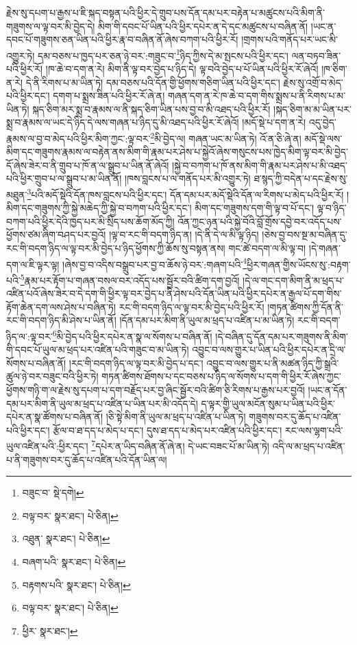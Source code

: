 རྗེས་སུ་དཔག་པ་རྒྱས་པ་ཇི་སྐད་བསྟན་པའི་ཕྱིར་དེ་གྲུབ་པས་དོན་དམ་པར་བརྟེན་པ་མཚུངས་པའི་མིག་ནི་གཟུགས་ལ་ལྟ་བར་མི་བྱེད་དེ། མིག་གི་དབང་པོ་ཡིན་པའི་ཕྱིར་དཔེར་ན་དེ་དང་མཚུངས་པ་བཞིན་ནོ། །ཡང་ན་དབང་པོ་གཟུགས་ཅན་ཡིན་པའི་ཕྱིར་རྣ་བ་བཞིན་ནོ་ཞེས་བཀག་པའི་ཕྱིར་རོ། །གྲགས་པའི་གནོད་པར་ཡང་མི་འགྱུར་ཏེ། དམ་བཅས་པ་ཁྱད་པར་ཅན་ཉེ་བར་:གཟུང་བ་\footnote{བཟུང་བ་  སྡེ་དགེ། }ཉིད་ཀྱིས་དེ་མ་སྤངས་པའི་ཕྱིར་དང་། ལན་བཏབ་ཟིན་པའི་ཕྱིར་རོ། །ཁ་ཆེ་བ་དག་ན་རེ། མིག་ནི་ལྟ་བར་བྱེད་པ་ཉིད་དེ། ལྟ་བའི་བྱེད་པ་པོ་ཡིན་པའི་ཕྱིར་རོ་ཞེའོ། །ཁ་ཅིག་ན་རེ། དེ་ནི་རིགས་པ་མ་ཡིན་ཏེ། དམ་བཅས་པའི་དོན་གྱི་ཕྱོགས་གཅིག་ཡིན་པའི་ཕྱིར་དང་། རྗེས་སུ་འགྲོ་བ་མེད་པའི་ཕྱིར་དང་། དགག་པ་སྨྲས་ཟིན་པའི་ཕྱིར་རོ་ཞེ་ན། གཞན་དག་ན་རེ་ཁ་ཆེ་བ་དག་གིས་སྨྲས་པ་ནི་རིགས་པ་མ་ཡིན་ཏེ། སྐད་ཅིག་མར་སྨྲ་བ་རྣམས་ལ་ནི་སྐད་ཅིག་ཡིན་པས་བྱ་བ་མི་འཐད་པའི་ཕྱིར་རོ། །སྐད་ཅིག་མ་མ་ཡིན་པར་སྨྲ་བ་རྣམས་ལ་ཡང་དེ་ཉིད་དེ་ལས་གཞན་པ་ཉིད་དུ་མི་འཐད་པའི་ཕྱིར་རོ་ཞེའོ། །མདོ་སྡེ་པ་དག་ན་རེ། འདུ་བྱེད་རྣམས་ལ་བྱ་བ་མེད་པའི་ཕྱིར་མིག་ཀྱང་:ལྟ་བར་\footnote{བལྟ་བར་  སྣར་ཐང་།  པེ་ཅིན། }མི་བྱེད་ལ། གཞན་ཡང་མ་ཡིན་ཏེ། འོ་ན་ཅི་ཞེ་ན། མདོ་སྡེ་ལས་མིག་དང་གཟུགས་རྣམས་ལ་བརྟེན་ནས་མིག་གི་རྣམ་པར་ཤེས་པ་སྐྱེའོ་ཞེས་གསུངས་པས་ཁྱེད་མིག་ལྟ་བར་མི་བྱེད་དོ་ཞེས་ཟེར་བ་ནི་གྲུབ་པ་ཁོ་ན་ལ་སྒྲུབ་པ་ཡིན་ནོ་ཞེའོ། །སྐྱེ་བ་བཀག་པ་ཁོ་ནས་མིག་གི་རྣམ་པར་ཤེས་པ་མི་འཐད་པའི་ཕྱིར་གྲུབ་པ་ལ་སྒྲུབ་པ་མ་ཡིན་ནོ། །ཁས་བླངས་པ་ལ་གནོད་པར་མི་འགྱུར་ཏེ། ཐ་སྙད་ཀྱི་བདེན་པ་དང་རྗེས་སུ་མཐུན་\footnote{འཐུན་  སྣར་ཐང་།  པེ་ཅིན། }པའི་མདོ་སྡེའི་དོན་ཁས་བླངས་པའི་ཕྱིར་དང་། དོན་དམ་པར་མདོ་སྡེའི་དོན་ལ་རིགས་པ་མེད་པའི་ཕྱིར་རོ། །མིག་དང་གཟུགས་ཀྱི་སྐྱེ་མཆེད་ཀྱི་སྐྱེ་བ་བཀག་པའི་ཕྱིར་དང་། མིག་དང་གཟུགས་དག་གི་ལྟ་བ་པོ་དང་། ལྟ་བ་ཉིད་བཀག་པའི་ཕྱིར་དེའི་ཁྱད་པར་མི་སྲིད་པས་ཆོག་མོད་ཀྱི། འོན་ཀྱང་ཉན་པའི་སྐྱེ་བོའི་བློ་གྲོས་དབྱེ་བར་འདོད་པས་ཕྱོགས་ཙམ་ཞིག་བཤད་པར་བྱའོ། །ལྟ་བ་རང་གི་བདག་ཉིད་ན། །དེ་ནི་དེ་ལ་མི་ལྟ་ཉིད། །ཅེས་བྱ་བས་སྔ་མ་བཞིན་དུ་རང་གི་བདག་ཉིད་ལ་ལྟ་བར་མི་བྱེད་པ་ཉིད་ཕྱོགས་ཀྱི་ཆོས་སུ་བསྟན་ནས། གང་ཚེ་བདག་ལ་མི་ལྟ་བ། །དེ་གཞན་དག་ལ་ཇི་ལྟར་ལྟ། །ཞེས་བྱ་བ་འདིས་བསྒྲུབ་པར་བྱ་བ་ཆོས་ཉེ་བར་:གཞག་པའི་\footnote{བཞག་པའི་  སྣར་ཐང་།  པེ་ཅིན། }ཕྱིར་གཞན་གྱིས་ཡོངས་སུ་:བརྟག་པའི་\footnote{བརྟགས་པའི་  སྣར་ཐང་།  པེ་ཅིན། }རྣམ་པར་རྟོག་པ་གཞན་བསལ་བར་འདོད་པས་སྦྱོར་བའི་ཚིག་དག་བྱའོ། །དེ་ལ་གང་དག་མིག་ནི་མ་ཕྲད་པ་འཛིན་པའོ་ཞེས་ཟེར་བ་དེ་དག་གི་ཕྱིར་ལྟ་བར་བྱེད་པ་ནི་ཤེས་པའི་དོན་ཡིན་པའི་ཕྱིར་དཔེར་ན་རྒྱལ་པོ་དག་གིས་རྟོག་ཆེན་དག་ལས་ཤེས་པ་བཞིན་ཏེ། རང་གི་བདག་ཉིད་ལ་ལྟ་བར་མི་བྱེད་པའི་ཕྱིར་རོ། །གཏན་ཚིགས་ཀྱི་དོན་ནི་རང་གི་བདག་ཉིད་མི་ཤེས་པ་ཡིན་ནོ། །དོན་དམ་པར་མིག་ནི་ཡུལ་མ་ཕྲད་པ་འཛིན་པ་མ་ཡིན་ཏེ། རང་གི་བདག་ཉིད་ལ་:ལྟ་བར་\footnote{བལྟ་བར་  སྣར་ཐང་།  པེ་ཅིན། }མི་བྱེད་པའི་ཕྱིར་དཔེར་ན་སྣ་ལ་སོགས་པ་བཞིན་ནོ། །དེ་བཞིན་དུ་དོན་དམ་པར་གཟུགས་ནི་མིག་གི་དབང་པོ་ཡུལ་མ་ཕྲད་པར་འཛིན་པའི་གཟུང་བ་མ་ཡིན་ཏེ། འབྱུང་བ་ལས་གྱུར་པ་ཡིན་པའི་ཕྱིར་དཔེར་ན་དྲི་ལ་སོགས་པ་བཞིན་ནོ། །རང་གི་བདག་ཉིད་ལ་ལྟ་བར་མི་བྱེད་པ་དང་། འབྱུང་བ་ལས་གྱུར་པ་ནི་མཚན་ཉིད་ཀྱི་སྒྲའི་ཚུལ་ཉེ་བར་བཟུང་བའི་ཕྱིར་ཏེ། གཏན་ཚིགས་ཐོགས་པ་དང་བཅས་པ་ཉིད་ལ་སོགས་པ་དག་གི་ཕྱིར་རོ་ཞེས་ཀྱང་ཕྱོགས་གཉི་ག་ལ་རྗེས་སུ་དཔག་པ་དག་བརྗོད་པར་བྱ་ཞིང་སྦྱོར་བའི་ཚིག་ཅི་རིགས་པ་རྒྱས་པར་བྱའོ། །ཡང་ན་དོན་དམ་པར་མིག་ནི་ཡུལ་མ་ཕྲད་པ་འཛིན་པ་ཡིན་པར་མི་འདོད་དེ། ད་ལྟར་གྱི་ཡུལ་མངོན་སུམ་པ་ཡིན་པའི་ཕྱིར་དཔེར་ན་སྣ་ཚོགས་པ་བཞིན་ནོ། །ཅི་སྟེ་མིག་ནི་ཡུལ་མ་ཕྲད་པ་འཛིན་པ་ཡིན་ཏེ། གཟུགས་བར་དུ་ཆོད་པ་འཛིན་པའི་ཕྱིར་དང་། རྩོལ་བ་ཐ་དད་པ་མེད་པ་དང་། དུས་ཐ་དད་པ་མེད་པར་འཛིན་པའི་ཕྱིར་དང་། རང་ལས་ལྷག་པའི་ཡུལ་འཛིན་པའི་:ཕྱིར་དང་། \footnote{ཕྱིར་  སྣར་ཐང་། }དཔེར་ན་ཡིད་བཞིན་ནོ་ཞེ་ན། དེ་ཡང་བཟང་པོ་མ་ཡིན་ཏེ། འདི་ལ་མ་ཕྲད་པ་འཛིན་པ་ནི་གཟུགས་བར་དུ་ཆོད་པ་འཛིན་པའི་དོན་ཡིན་ལ། 